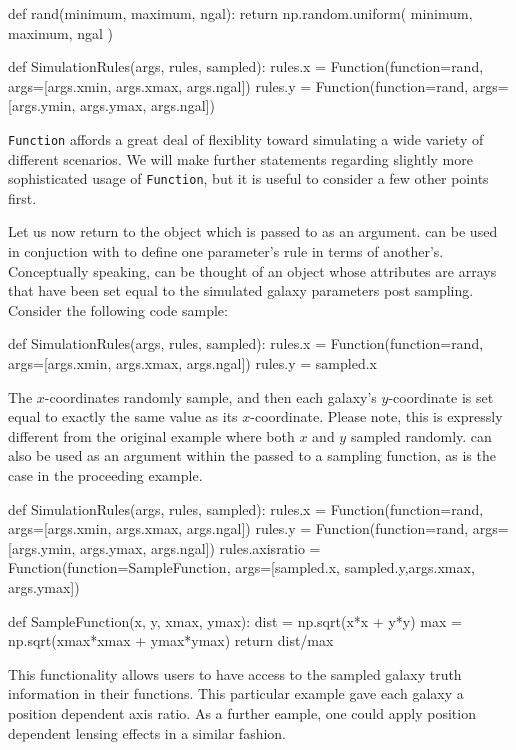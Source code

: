 \documentclass[12pt]{book}
\newcommand{\codett}[1]{\lstinline{#1}}
\begin{document}
\begin{code}
def rand(minimum, maximum, ngal):
    return np.random.uniform( minimum, maximum, ngal )

def SimulationRules(args, rules, sampled):
    rules.x = Function(function=rand, args=[args.xmin, args.xmax, args.ngal])
    rules.y = Function(function=rand, args=[args.ymin, args.ymax, args.ngal])
\end{code}

\noindent \codett{Function} affords a great deal of flexiblity toward
simulating a wide variety of different scenarios.
We will make further statements regarding slightly more sophisticated usage
of \codett{Function}, but it is useful to consider a few other points first.

Let us now return to the \simsamp{} object which is passed to \simfunc{} as an argument.
\simsamp{} can be used in conjuction with \simrules{} to define one parameter's rule in terms of another's.
Conceptually speaking, \simsamp{} can be thought of an object whose attributes are arrays that 
have been set equal to the simulated galaxy parameters post sampling.
Consider the following code sample:

\begin{code}
def SimulationRules(args, rules, sampled):
    rules.x = Function(function=rand, args=[args.xmin, args.xmax, args.ngal])
    rules.y = sampled.x
\end{code}

\noindent The $x$-coordinates randomly sample, and then each galaxy's $y$-coordinate
is set equal to exactly the same value as its $x$-coordinate.
Please note, this is expressly different from the original example where both $x$ and $y$ sampled randomly.
\simsamp{} can also be used as an argument within the \simargs{} passed to a sampling function,
as is the case in the proceeding example.

\begin{code}
def SimulationRules(args, rules, sampled):
    rules.x = Function(function=rand, args=[args.xmin, args.xmax, args.ngal])
    rules.y = Function(function=rand, args=[args.ymin, args.ymax, args.ngal])
    rules.axisratio = Function(function=SampleFunction, args=[sampled.x, sampled.y,args.xmax, args.ymax])

def SampleFunction(x, y, xmax, ymax):
    dist = np.sqrt(x*x + y*y)
    max = np.sqrt(xmax*xmax + ymax*ymax)
    return dist/max
\end{code}

\noindent This functionality allows users to have access to the sampled galaxy truth
information in their functions.
This particular example gave each galaxy a position dependent axis ratio.
As a further eample, one could apply position dependent lensing effects in a similar fashion.
\end{document}
